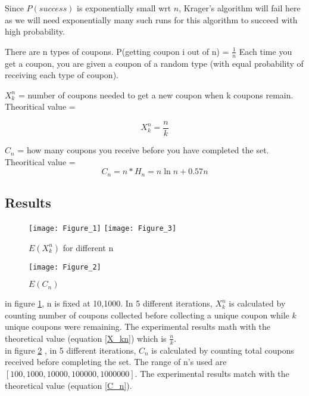 \documentclass{homeworg}
\let\Oldsubsection\subsection
\renewcommand{\subsection}{\FloatBarrier\Oldsubsection}
\begin{document}
Since $P(success)$ is exponentially small wrt $n$, Krager's algorithm will fail here as we will need exponentially many such runs for this algorithm to succeed with high probability.

\newpage



\exercise
There are n types of coupons.
P(getting coupon i out of n) = $\frac{1}{n}$
Each time you get a coupon, you are given a coupon of a random type (with equal probability of receiving each type of coupon).

$X_k^n$ = number of coupons needed to get a new coupon when k coupons remain. \\
Theoritical value = 

\begin{equation}
\label{X_kn}
X_k^n = \frac{n}{k}
\end{equation}

$C_n$ = how many coupons you receive before you have completed the set. \\ 
Theoritical value = 
\begin{equation}
\label{C_n}
C_n = n \ast H_n = n \ln n +0.57n    
\end{equation}

\subsection{Results}
\begin{figure}[h]
    \centering
    \texttt{[image: Figure\_1]}
    \texttt{[image: Figure\_3]}
    \caption{$E(X_k^n)$ for different n}
    \label{fig:X_kn}
\end{figure}



\begin{figure}[h]
    \centering
    \texttt{[image: Figure\_2]}
    \caption{$E(C_n)$}
    \label{fig:C_n}
\end{figure}

in figure \ref{fig:X_kn}, n is fixed at 10,1000. In 5 different iterations, $X_k^n$ is calculated by counting number of coupons collected before collecting a unique coupon while $k$ unique coupons were remaining. The experimental results math with the theoretical value (equation \ref{X_kn}) which is $\frac{n}{k}$.\\

in figure \ref{fig:C_n} , in 5 different iterations, $C_n$ is calculated by counting total coupons received before completing the set. The range of n's used are $[100, 1000, 10000, 100000, 1000000]$. The experimental results match with the theoretical value (equation \ref{C_n}).
\end{document}
